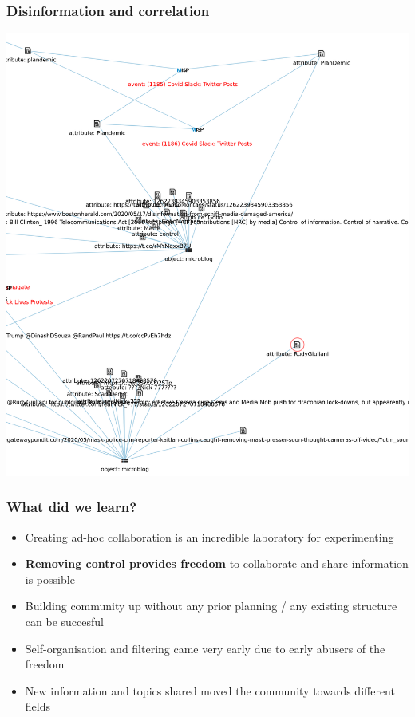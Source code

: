 \begin{frame}
    \frametitle{Disinformation and correlation}
    \includegraphics[scale=0.15]{misinfo-correlation.png}
\end{frame}

\begin{frame}
    \frametitle{What did we learn?}
    \begin{itemize}
        \item Creating ad-hoc collaboration is an incredible laboratory for experimenting
        \item {\bf Removing control provides freedom} to collaborate and share information is possible
        \item Building community up without any prior planning / any existing structure can be succesful
        \item Self-organisation and filtering came very early due to early abusers of the freedom
        \item New information and topics shared moved the community towards different fields
    \end{itemize}
\end{frame}



